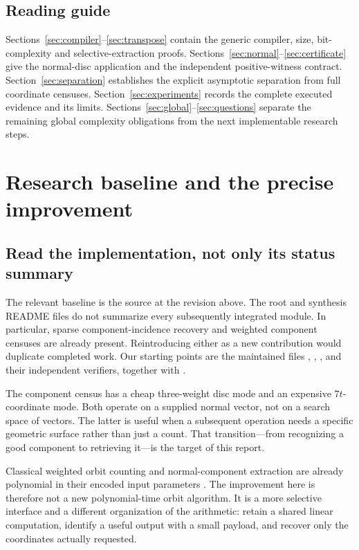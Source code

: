 \documentclass[11pt]{article}
\theoremstyle{definition}\newtheorem{definition}[theorem]{Definition}
\theoremstyle{remark}\newtheorem{remark}[theorem]{Remark}
\begin{document}
\subsection*{Reading guide}
Sections~\ref{sec:compiler}--\ref{sec:transpose} contain the generic compiler,
size, bit-complexity and selective-extraction proofs.
Sections~\ref{sec:normal}--\ref{sec:certificate} give the normal-disc application
and the independent positive-witness contract.
Section~\ref{sec:separation} establishes the explicit asymptotic separation from
full coordinate censuses. Section~\ref{sec:experiments} records the complete
executed evidence and its limits. Sections~\ref{sec:global}--\ref{sec:questions}
separate the remaining global complexity obligations from the next implementable
research steps.
\clearpage

\section{Research baseline and the precise improvement}
\label{sec:baseline}

\subsection{Read the implementation, not only its status summary}
The relevant baseline is the source at the revision above. The root and synthesis
README files do not summarize every subsequently integrated module. In particular,
sparse component-incidence recovery and weighted component censuses are already
present. Reintroducing either as a new contribution would duplicate completed
work. Our starting points are the maintained files
, ,
, and their independent verifiers, together
with  \cite{repo}.

The component census has a cheap three-weight disc mode and an expensive
$7t$-coordinate mode. Both operate on a supplied normal vector, not on a search
space of vectors. The latter is useful when a subsequent operation needs a
specific geometric surface rather than just a count. That transition---from
recognizing a good component to retrieving it---is the target of this report.

Classical weighted orbit counting and normal-component extraction are already
polynomial in their encoded input parameters \cite[Theorem 16 and Corollary 17]{aht}.
The improvement here is therefore not a new polynomial-time orbit algorithm.
It is a more selective interface and a different organization of the arithmetic:
retain a shared linear computation, identify a useful output with a small payload,
and recover only the coordinates actually requested.
\end{document}
